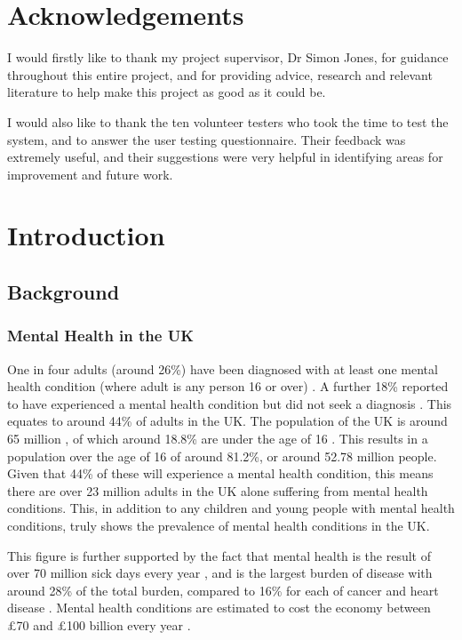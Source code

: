 \documentclass[11pt,openright,a4paper]{report}
\begin{document}
\tableofcontents
\newpage
\listoffigures
\newpage
\listoftables
\newpage


\chapter*{Acknowledgements}
I would firstly like to thank my project supervisor, Dr Simon Jones, for guidance throughout this entire project, and for providing advice, research and relevant literature to help make this project as good as it could be.

I would also like to thank the ten volunteer testers who took the time to test the system, and to answer the user testing questionnaire. Their feedback was extremely useful, and their suggestions were very helpful in identifying areas for improvement and future work.

\newpage
\setcounter{page}{1}

\chapter{Introduction}
\section{Background}
\subsection{Mental Health in the UK}
One in four adults (around 26\%) have been diagnosed with at least one mental health condition (where adult is any person 16 or over) \parencite{hse2014}. A further 18\% reported to have experienced a mental health condition but did not seek a diagnosis \parencite{hse2014}. This equates to around 44\% of adults in the UK. The population of the UK is around 65 million \parencite{onspopulation}, of which around 18.8\% are under the age of 16 \parencite{onspopulation}. This results in a population over the age of 16 of around 81.2\%, or around 52.78 million people. Given that 44\% of these will experience a mental health condition, this means there are over 23 million adults in the UK alone suffering from mental health conditions. This, in addition to any children and young people with mental health conditions, truly shows the prevalence of mental health conditions in the UK.

This figure is further supported by the fact that mental health is the result of over 70 million sick days every year \parencite{cmoreport2013}, and is the largest burden of disease with around 28\% of the total burden, compared to 16\% for each of cancer and heart disease \parencite{burdendisorders}. Mental health conditions are estimated to cost the economy between £70 and £100 billion every year \parencite{cmoreport2013}.
\end{document}
